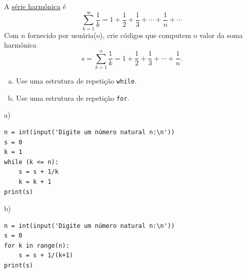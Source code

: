\begin{exer}
  A \href{https://pt.wikipedia.org/wiki/S\%C3\%A9rie_harm\%C3\%B3nica_(matem\%C3\%A1tica)}{série harmônica} é
  \begin{equation}
    \sum_{k=1}^\infty \frac{1}{k} = 1 + \frac{1}{2} + \frac{1}{3} + \cdots + \frac{1}{n} + \cdots
  \end{equation}
  Com $n$ fornecido por usuária(o), crie códigos que computem o valor da soma harmônica
  \begin{equation}
    s = \sum_{k=1}^n \frac{1}{k} = 1 + \frac{1}{2} + \frac{1}{3} + \cdots + \frac{1}{n}.
  \end{equation}
  \begin{enumerate}[a)]
  \item Use uma estrutura de repetição \lstinline+while+.
  \item Use uma estrutura de repetição \lstinline+for+.
  \end{enumerate}
\end{exer}
\begin{resp}
a)

\begin{lstlisting}
n = int(input('Digite um número natural n:\n'))
s = 0
k = 1
while (k <= n):
    s = s + 1/k
    k = k + 1
print(s)
\end{lstlisting}

b)

\begin{lstlisting}
n = int(input('Digite um número natural n:\n'))
s = 0
for k in range(n):
    s = s + 1/(k+1)
print(s)
\end{lstlisting}

\end{resp}

